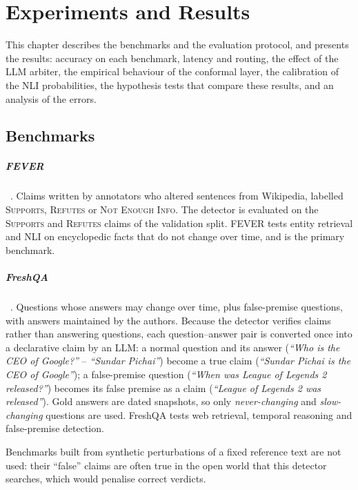 \chapter{Experiments and Results}
\label{ch:results}

This chapter describes the benchmarks and the evaluation protocol, and presents the results: accuracy on each benchmark, latency and routing, the effect of the LLM arbiter, the empirical behaviour of the conformal layer, the calibration of the NLI probabilities, the hypothesis tests that compare these results, and an analysis of the errors.

\section{Benchmarks}

\paragraph{FEVER}~\citep{thorne2018fever}. Claims written by annotators who altered sentences from Wikipedia, labelled \textsc{Supports}, \textsc{Refutes} or \textsc{Not Enough Info}. The detector is evaluated on the \textsc{Supports} and \textsc{Refutes} claims of the validation split. FEVER tests entity retrieval and NLI on encyclopedic facts that do not change over time, and is the primary benchmark.

\paragraph{FreshQA}~\citep{vu2023freshllms}. Questions whose answers may change over time, plus false-premise questions, with answers maintained by the authors. Because the detector verifies claims rather than answering questions, each question--answer pair is converted once into a declarative claim by an LLM: a normal question and its answer (\emph{``Who is the CEO of Google?''} -- \emph{``Sundar Pichai''}) become a true claim (\emph{``Sundar Pichai is the CEO of Google''}); a false-premise question (\emph{``When was League of Legends 2 released?''}) becomes its false premise as a claim (\emph{``League of Legends 2 was released''}). Gold answers are dated snapshots, so only \emph{never-changing} and \emph{slow-changing} questions are used. FreshQA tests web retrieval, temporal reasoning and false-premise detection.

Benchmarks built from synthetic perturbations of a fixed reference text are not used: their ``false'' claims are often true in the open world that this detector searches, which would penalise correct verdicts.


